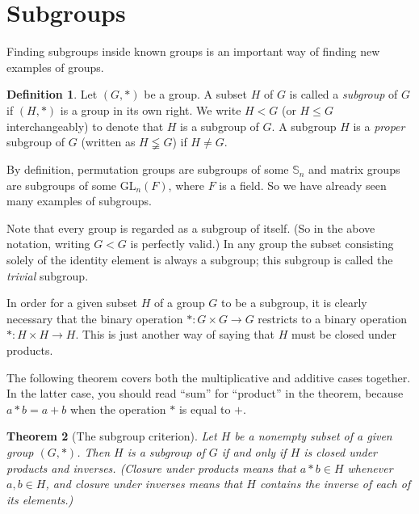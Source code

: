 \documentclass[11pt]{article}
\newtheorem{thm}{Theorem}[section]
\theoremstyle{definition}
\newtheorem{defn}[thm]{Definition}
\newcommand{\GL}{\mathrm{GL}}
\newcommand{\Sym}{\mathbb{S}}
\begin{document}
 

\newpage
\section{Subgroups}\noindent
Finding subgroups inside known groups is an important way of finding
new examples of groups. 

\begin{defn}
  Let $(G,*)$ be a group. A subset $H$ of $G$ is called a
  \emph{subgroup} of $G$ if $(H,*)$ is a group in its own right. We
  write $H<G$ (or $H \le G$ interchangeably) to denote that $H$ is a
  subgroup of $G$. A subgroup $H$ is a \emph{proper} subgroup of $G$
  (written as $H \lneqq G$) if $H \ne G$.
\end{defn}


By definition, permutation groups are subgroups of some $\Sym_n$ and
matrix groups are subgroups of some $\GL_n(F)$, where $F$ is a field.
So we have already seen many examples of subgroups.

Note that every group is regarded as a subgroup of itself. (So in the
above notation, writing $G<G$ is perfectly valid.) In any group the
subset consisting solely of the identity element is always a subgroup;
this subgroup is called the \emph{trivial} subgroup.

In order for a given subset $H$ of a group $G$ to be a subgroup, it is
clearly necessary that the binary operation $*: G \times G \to G$
restricts to a binary operation $*: H \times H \to H$. This is just
another way of saying that $H$ must be closed under products.

The following theorem covers both the multiplicative and additive
cases together. In the latter case, you should read ``sum'' for
``product'' in the theorem, because $a*b = a+b$ when the operation $*$
is equal to $+$. 


\begin{thm}[The subgroup criterion]
  Let $H$ be a nonempty subset of a given group $(G,*)$.  Then $H$ is
  a subgroup of $G$ if and only if $H$ is closed under products and
  inverses. (Closure under products means that $a*b \in H$ whenever
  $a,b \in H$, and closure under inverses means that $H$ contains the
  inverse of each of its elements.)
\end{thm}
\end{document}
